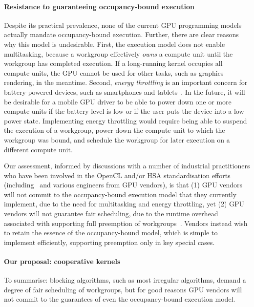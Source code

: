 \documentclass[numbers,nocopyrightspace,10pt]{sigplanconf}
\begin{document}
\paragraph{Resistance to guaranteeing occupancy-bound execution}

Despite its practical prevalence, none of the current GPU programming
models actually mandate occupancy-bound execution.  Further, there are
clear reasons why this model is undesirable.
First, the execution model does not enable
multitasking, because a workgroup effectively \emph{owns} a compute
unit until the workgroup has completed execution.  If a long-running
kernel occupies all compute units, the GPU cannot be used for other
tasks, such as graphics rendering, in the meantime.
Second, \emph{energy throttling} is
an important concern for battery-powered devices, such as smartphones
and tablets~\cite{DBLP:journals/comsur/Vallina-RodriguezC13}.  In the future, it will be desirable for a mobile GPU driver to be able to
power down one or more compute units if the battery level is low or if
the user puts the device into a low power state.  Implementing energy
throttling would require being able to suspend the execution of a
workgroup, power down the compute unit to which the workgroup was
bound, and schedule the workgroup for later execution on a different
compute unit.

Our assessment, informed by discussions with a number of industrial
practitioners who have been involved in the OpenCL and/or HSA
standardisation efforts
(including~\cite{PersonalCommunicationRichards,PersonalCommunicationHowes}
and various engineers from GPU vendors), is that (1) GPU vendors will
not commit to the occupancy-bound execution model that they currently
implement, due to the need for multitasking and energy throttling,
yet (2) GPU vendors will not guarantee fair scheduling, due to the
runtime overhead associated with supporting full preemption of
workgroups~\cite{ISCAPAPERSreeMentioned}.  Vendors instead wish to
retain the essence of the occupancy-bound model, which is
simple to implement efficiently, supporting preemption
only in key special cases.


\paragraph{Our proposal: cooperative kernels}
%
To summarise: blocking algorithms, such as most irregular algorithms,
demand a degree of fair scheduling of workgroups, but for good reasons
GPU vendors will not commit to the guarantees of even the
occupancy-bound execution model.
\end{document}
